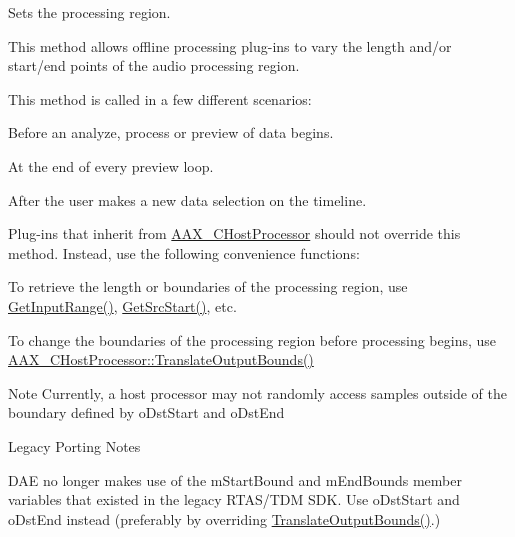 Sets the processing region. 

This method allows offline processing plug-\/ins to vary the length and/or start/end points of the audio processing region.

This method is called in a few different scenarios\+:
\begin{DoxyItemize}
\item Before an analyze, process or preview of data begins.
\item At the end of every preview loop.
\item After the user makes a new data selection on the timeline.
\end{DoxyItemize}

Plug-\/ins that inherit from \mbox{\hyperlink{a01485}{A\+A\+X\+\_\+\+C\+Host\+Processor}} should not override this method. Instead, use the following convenience functions\+:
\begin{DoxyItemize}
\item To retrieve the length or boundaries of the processing region, use \mbox{\hyperlink{a01485_a2b93d94600b7d356bba14e070b8b40a3}{Get\+Input\+Range()}}, \mbox{\hyperlink{a01485_aec4fa455a4e8ecccc245ce30b596c7b4}{Get\+Src\+Start()}}, etc.
\item To change the boundaries of the processing region before processing begins, use \mbox{\hyperlink{a01485_a4d793e60071069e6f98c4d841d37ac96}{A\+A\+X\+\_\+\+C\+Host\+Processor\+::\+Translate\+Output\+Bounds()}}
\end{DoxyItemize}

\begin{DoxyNote}{Note}
Currently, a host processor may not randomly access samples outside of the boundary defined by {\ttfamily o\+Dst\+Start} and {\ttfamily o\+Dst\+End} 
\end{DoxyNote}
\begin{DoxyRefDesc}{Legacy Porting Notes}
\item[\mbox{\hyperlink{a00787__porting_notes000007}{Legacy Porting Notes}}]D\+AE no longer makes use of the m\+Start\+Bound and m\+End\+Bounds member variables that existed in the legacy R\+T\+A\+S/\+T\+DM S\+DK. Use {\ttfamily o\+Dst\+Start} and {\ttfamily o\+Dst\+End} instead (preferably by overriding \mbox{\hyperlink{a01485_a4d793e60071069e6f98c4d841d37ac96}{Translate\+Output\+Bounds()}}.)\end{DoxyRefDesc}



